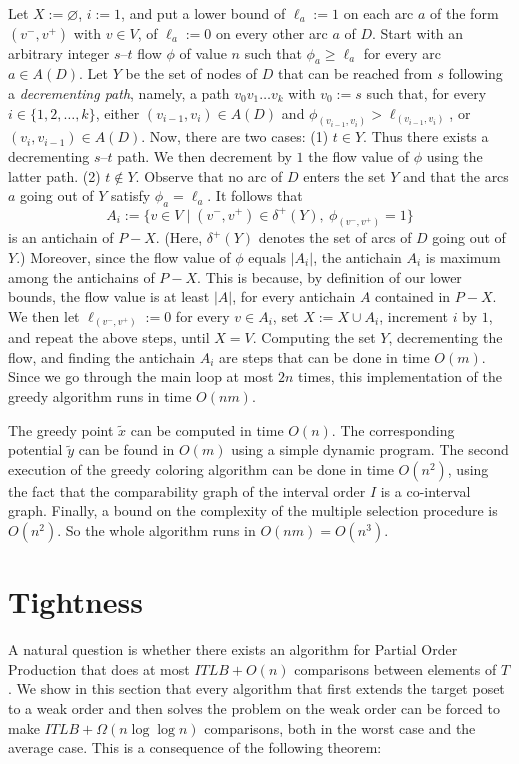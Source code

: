 \documentclass[12pt,oneside]{article}
\newcommand{\partsort}{{\sc Partial Order Production}}
\begin{document}
Let $X := \varnothing$, $i:=1$, and put a lower bound
of $\ell_{a}:=1$ on each arc $a$ of the form $(v^{-}, v^{+})$ with
$v \in V $, of $\ell_{a}:=0$ on every other arc $a$ of $D$.
Start with an arbitrary integer $s$--$t$ flow $\phi$ of value $n$ such that $\phi_{a} \geq \ell_{a}$
for every arc $a\in A(D)$. Let $Y$ be the set of nodes of $D$ that can be reached
from $s$ following a {\em decrementing path}, namely, a
path $v_{0}v_{1}\dots v_{k}$ with $v_{0}:=s$ such that, for every $i \in \{1, 2, \dots, k\}$,
either $(v_{i-1}, v_{i}) \in A(D)$ and $\phi_{(v_{i-1}, v_{i})} > \ell_{(v_{i-1}, v_{i})}$, or
$(v_{i}, v_{i-1}) \in A(D)$. Now, there are two cases: (1)  $t \in Y$. Thus there exists
a decrementing $s$--$t$ path. We then decrement by $1$ the flow value of $\phi$
using the latter path. (2) $t \notin Y$. Observe that no arc of $D$ enters the set $Y$ and that
the arcs $a$ going out of $Y$ satisfy $\phi_{a} = \ell_{a}$.
It follows that
$$
A_{i} := \{v\in V \mid (v^{-}, v^{+}) \in \delta^{+}(Y),\ \phi_{(v^{-}, v^{+})} = 1\}
$$
is an antichain of $P-X$. (Here,  $\delta^{+}(Y)$ denotes the set of arcs of $D$ going out of $Y$.)
Moreover, since the flow value of $\phi$ equals $|A_{i}|$, the antichain $A_{i}$
is maximum among the antichains of $P - X$. This is because, by definition of our lower bounds,
the flow value is at least $|A|$, for every antichain $A$ contained in $P-X$. We then
let $\ell_{(v^{-}, v^{+})}:=0$ for every $v \in A_{i}$, set $X := X \cup A_{i}$,
increment $i$ by $1$, and repeat the above steps, until
$X = V$.  Computing the set $Y$, decrementing the flow, and finding the antichain $A_{i}$
are steps that can be done in time $O(m)$. Since we go through the main loop at most
$2n$ times, this implementation of the greedy algorithm runs in time $O(nm)$.

The  greedy point $\tilde x$ can be computed in time $O(n)$. The
corresponding potential $\tilde y$ can be found in $O(m)$ using a simple dynamic program.
The second execution of the greedy coloring algorithm can be done in time $O(n^2)$,
using the fact that the comparability graph of the interval order $I$ is a co-interval graph.
Finally, a bound on the complexity of the multiple selection procedure is $O(n^2)$.
So the whole algorithm runs in $O(nm) = O(n^3)$.

\section{Tightness}
\label{sec-discussion}

A natural question is whether there exists an algorithm for {\partsort} that
does at most $ITLB + O(n)$ comparisons between elements of $T$.
We show in this section that every algorithm that first extends the target poset to a weak order and then solves the problem on the weak order can be forced to make $ITLB + \Omega(n\log\log n)$ comparisons, both in the worst case and the average case. This is a consequence of the following theorem:
\end{document}
